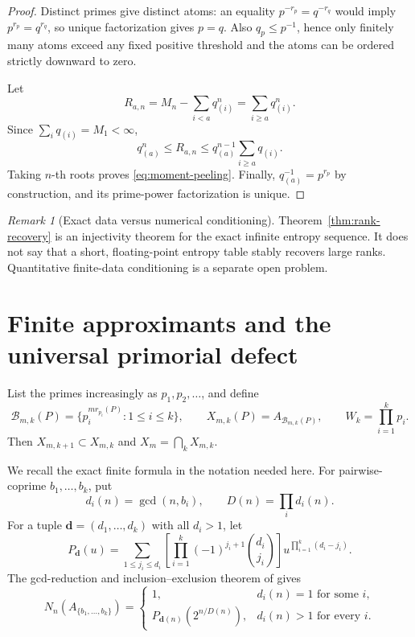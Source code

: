 \documentclass[11pt]{article}
\numberwithin{equation}{section}
\theoremstyle{remark}
\newtheorem{remark}[theorem]{Remark}
\newcommand{\cB}{\mathcal B}
\begin{document}
\begin{proof}
Distinct primes give distinct atoms: an equality $p^{-r_p}=q^{-r_q}$
would imply $p^{r_p}=q^{r_q}$, so unique factorization gives $p=q$.
Also $q_p\le p^{-1}$, hence only finitely many atoms exceed any fixed
positive threshold and the atoms can be ordered strictly downward to zero.

Let
\[
 R_{a,n}=M_n-\sum_{i<a}q_{(i)}^n
 =\sum_{i\ge a}q_{(i)}^n.
\]
Since $\sum_iq_{(i)}=M_1<\infty$,
\[
 q_{(a)}^n\le R_{a,n}
 \le q_{(a)}^{n-1}\sum_{i\ge a}q_{(i)}.
\]
Taking $n$-th roots proves \eqref{eq:moment-peeling}.  Finally,
$q_{(a)}^{-1}=p^{r_p}$ by construction, and its prime-power factorization
is unique.
\end{proof}

\begin{remark}[Exact data versus numerical conditioning]
Theorem~\ref{thm:rank-recovery} is an injectivity theorem for the exact
infinite entropy sequence.  It does not say that a short, floating-point
entropy table stably recovers large ranks.  Quantitative finite-data
conditioning is a separate open problem.
\end{remark}

\section{Finite approximants and the universal primorial defect}

List the primes increasingly as $p_1,p_2,\ldots$, and define
\begin{equation}
 \cB_{m,k}(P)=\{p_i^{m r_{p_i}(P)}:1\le i\le k\},
 \qquad
 X_{m,k}(P)=A_{\cB_{m,k}(P)},
 \qquad
 W_k=\prod_{i=1}^k p_i.
 \label{eq:finite-approximants}
\end{equation}
Then $X_{m,k+1}\subset X_{m,k}$ and
$X_m=\bigcap_kX_{m,k}$.

We recall the exact finite formula in the notation needed here.  For
pairwise-coprime $b_1,\ldots,b_k$, put
\[
 d_i(n)=\gcd(n,b_i),
 \qquad
 D(n)=\prod_i d_i(n).
\]
For a tuple $\boldsymbol d=(d_1,\ldots,d_k)$ with all $d_i>1$, let
\begin{equation}
 P_{\boldsymbol d}(u)
 =\sum_{1\le j_i\le d_i}
 \left[\prod_{i=1}^k(-1)^{j_i+1}\binom{d_i}{j_i}\right]
 u^{\prod_{i=1}^k(d_i-j_i)}.
 \label{eq:coprime-polynomial}
\end{equation}
The gcd-reduction and inclusion--exclusion theorem of
\citet{WangPeriodicCollapse2026} gives
\begin{equation}
 N_n(A_{\{b_1,\ldots,b_k\}})
 =\begin{cases}
 1,&d_i(n)=1\text{ for some }i,\\
 P_{\boldsymbol d(n)}(2^{n/D(n)}),&d_i(n)>1\text{ for every }i.
 \end{cases}
 \label{eq:finite-fixed-count}
\end{equation}
\end{document}
